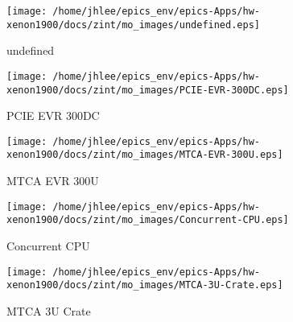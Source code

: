 \noindent
\vspace{1.4cm}
\begin{minipage}{.2\textwidth}
\begin{center}
\texttt{[image: /home/jhlee/epics\_env/epics-Apps/hw-xenon1900/docs/zint/mo\_images/undefined.eps]}
\end{center}
\end{minipage}
\begin{minipage}{.7\textwidth}
undefined
\end{minipage}


\noindent
\vspace{1.4cm}
\begin{minipage}{.2\textwidth}
\begin{center}
\texttt{[image: /home/jhlee/epics\_env/epics-Apps/hw-xenon1900/docs/zint/mo\_images/PCIE-EVR-300DC.eps]}
\end{center}
\end{minipage}
\begin{minipage}{.7\textwidth}
PCIE EVR 300DC
\end{minipage}


\noindent
\vspace{1.4cm}
\begin{minipage}{.2\textwidth}
\begin{center}
\texttt{[image: /home/jhlee/epics\_env/epics-Apps/hw-xenon1900/docs/zint/mo\_images/MTCA-EVR-300U.eps]}
\end{center}
\end{minipage}
\begin{minipage}{.7\textwidth}
MTCA EVR 300U
\end{minipage}


\noindent
\vspace{1.4cm}
\begin{minipage}{.2\textwidth}
\begin{center}
\texttt{[image: /home/jhlee/epics\_env/epics-Apps/hw-xenon1900/docs/zint/mo\_images/Concurrent-CPU.eps]}
\end{center}
\end{minipage}
\begin{minipage}{.7\textwidth}
Concurrent CPU
\end{minipage}


\noindent
\vspace{1.4cm}
\begin{minipage}{.2\textwidth}
\begin{center}
\texttt{[image: /home/jhlee/epics\_env/epics-Apps/hw-xenon1900/docs/zint/mo\_images/MTCA-3U-Crate.eps]}
\end{center}
\end{minipage}
\begin{minipage}{.7\textwidth}
MTCA 3U Crate
\end{minipage}


